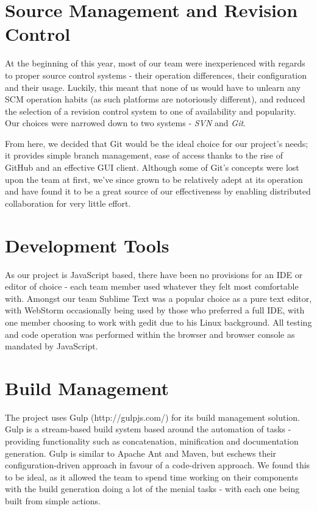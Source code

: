 \documentclass{l3proj}
\begin{document}
\section{Source Management and Revision Control}
\label{dev-scm}
At the beginning of this year, most of our team were inexperienced with regards to proper source control systems - their operation differences, their configuration and their usage. Luckily, this meant that none of us would have to unlearn any SCM operation habits (as such platforms are notoriously different), and reduced the selection of a revision control system to one of availability and popularity. Our choices were narrowed down to two systems - \textit{SVN} and \textit{Git}.

From here, we decided that Git would be the ideal choice for our project's needs; it provides simple branch management, ease of access thanks to the rise of GitHub and an effective GUI client. Although some of Git's concepts were lost upon the team at first, we've since grown to be relatively adept at its operation and have found it to be a great source of our effectiveness by enabling distributed collaboration for very little effort.

\section{Development Tools}
\label{dev-tools}
As our project is JavaScript based, there have been no provisions for an IDE or editor of choice - each team member used whatever they felt most comfortable with. Amongst our team Sublime Text was a popular choice as a pure text editor, with WebStorm occasionally being used by those who preferred a full IDE, with one member choosing to work with gedit due to his Linux background. All testing and code operation was performed within the browser and browser console as mandated by JavaScript.

\section{Build Management}
\label{dev-build}
The project uses Gulp (http://gulpjs.com/) for its build management solution. Gulp is a stream-based build system based around the automation of tasks - providing functionality such as concatenation, minification and documentation generation. Gulp is similar to Apache Ant and Maven, but eschews their configuration-driven approach in favour of a code-driven approach. We found this to be ideal, as it allowed the team to spend time working on their components with the build generation doing a lot of the menial tasks - with each one being built from simple actions.
\end{document}
